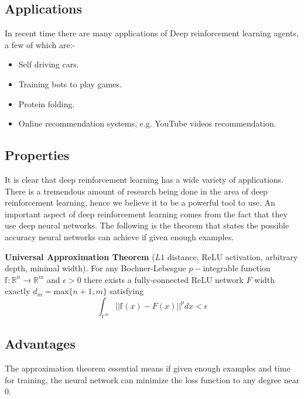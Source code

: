\subsection{Applications}
In recent time there are many applications of Deep reinforcement learning agents, a few of which are:-
\begin{itemize}
    \item Self driving cars.
    \item Training bots to play games.
    \item Protein folding.
    \item Online recommendation systems, e.g. YouTube videos recommendation.
\end{itemize}
\subsection{Properties}
It is clear that deep reinforcement learning has a wide variety of applications. There is a tremendous amount of research being done in the area of deep reinforcement learning, hence we believe it to be a powerful tool to use. An important aspect of deep reinforcement learning comes from the fact that they use deep neural networks. The following is the theorem that states the possible accuracy neural networks can achieve if given enough examples.

\par \textbf{Universal Approximation Theorem} ($L1$ distance, ReLU activation, arbitrary depth, minimal width). For any Bochner-Lebesgue $p-$integrable function $\mathbb{f}:\mathbb{R}^{n}\rightarrow\mathbb{R}^{m}$ and $\epsilon>0$ there exists a fully-connected ReLU network $F$ width exactly $d_{m}=\text{max}\{n+1,m\}$ satisfying 
$$\int_{\mathbb{r}^{m}}||\mathbb{f}(x)-F(x)||^{p}dx<\epsilon$$


\subsection{Advantages}
The approximation theorem essential means if given enough examples and time for training, the neural network can minimize the loss function to any degree near $0$. 



